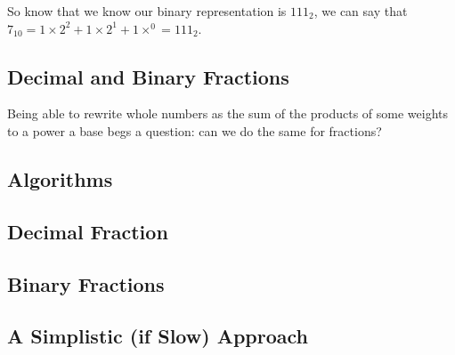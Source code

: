 \documentclass[12pt]{article}
\begin{document}
\par So know that we know our binary representation is $111_2$, we can say that $7_{10} = 1\times2^2+1\times2^1+1\times^0 = 111_2$.

\subsection{Decimal and Binary Fractions}
Being able to rewrite whole numbers as the sum of the products of some weights to a power a base begs a question: can we do the same for fractions?

\newpage %



\begin{center}
\section{Algorithms}
\end{center}

\subsection{Decimal Fraction}

\subsection{Binary Fractions}

\subsection{A Simplistic (if Slow) Approach}
\end{document}
